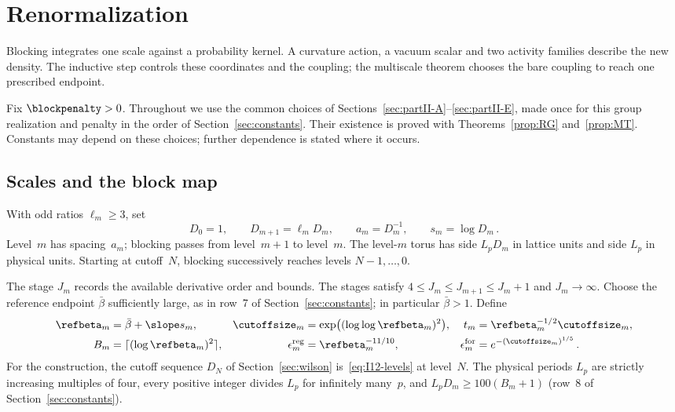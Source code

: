 \section{Renormalization}\label{sec:renormalization}

Blocking integrates one scale against a probability kernel. A curvature action, a vacuum scalar and two activity families describe the new density. The inductive step controls these coordinates and the coupling; the multiscale theorem chooses the bare coupling to reach one prescribed endpoint.

Fix $\blockpenalty>0$. Throughout we use the common choices of Sections~\ref{sec:partII-A}--\ref{sec:partII-E}, made once for this group realization and penalty in the order of Section~\ref{sec:constants}. Their existence is proved with Theorems~\ref{prop:RG} and~\ref{prop:MT}. Constants may depend on these choices; further dependence is stated where it occurs.

\subsection{Scales and the block map}

With odd ratios $\ell_m\ge3$, set
\begin{equation}\label{eq:I12-levels}
D_0=1,\qquad D_{m+1}=\ell_mD_m,\qquad a_m=D_m^{-1},\qquad s_m=\log D_m\,.
\end{equation}
Level~$m$ has spacing~$a_m$; blocking passes from level~$m+1$ to level~$m$. The level-$m$ torus has side $L_pD_m$ in lattice units and side $L_p$ in physical units. Starting at cutoff~$N$, blocking successively reaches levels $N-1,\ldots,0$.

The stage $J_m$ records the available derivative order and bounds. The stages satisfy $4\le J_m\le J_{m+1}\le J_m+1$ and $J_m\to\infty$. Choose the reference endpoint $\bar\beta$ sufficiently large, as in row~7 of Section~\ref{sec:constants}; in particular $\bar\beta>1$. Define
\begin{align}\label{eq:I12-scales}
\refbeta_m&=\bar\beta+\slope s_m,&
\cutoffsize_m&=\exp\bigl((\log\log\refbeta_m)^2\bigr),&
t_m&=\refbeta_m^{-1/2}\cutoffsize_m,\\
B_m&=\lceil(\log\refbeta_m)^2\rceil,&
\epsilon_m^{\rm reg}&=\refbeta_m^{-11/10},&
\epsilon_m^{\rm for}&=e^{-(\cutoffsize_m)^{1/5}}\,.
\end{align}
For the construction, the cutoff sequence $D_N$ of Section~\ref{sec:wilson} is~\eqref{eq:I12-levels} at level~$N$. The physical periods $L_p$ are strictly increasing multiples of four, every positive integer divides $L_p$ for infinitely many~$p$, and $L_pD_m\ge100(B_m+1)$ (row~8 of Section~\ref{sec:constants}).

